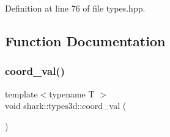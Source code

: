 Definition at line 76 of file types.\+hpp.



\subsection{Function Documentation}
\hypertarget{namespaceshark_1_1types3d_a7cc03a0b9b11f9e1326d02e6d849da28}{}\label{namespaceshark_1_1types3d_a7cc03a0b9b11f9e1326d02e6d849da28} 
\subsubsection{\texorpdfstring{coord\+\_\+val()}{coord\_val()}}
{\footnotesize\ttfamily template$<$typename T $>$ \\
void shark\+::types3d\+::coord\+\_\+val (\begin{DoxyParamCaption}{ }\end{DoxyParamCaption})}

